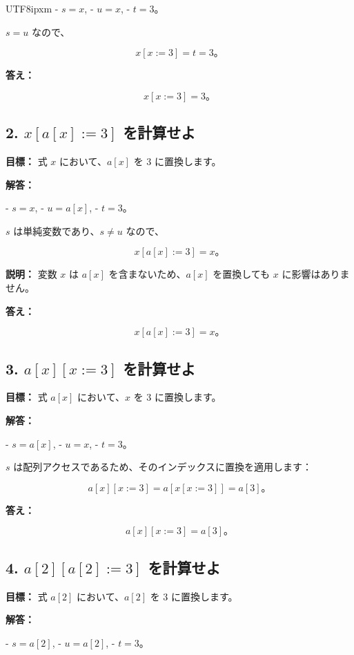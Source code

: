 \documentclass[12pt,a4paper]{article}
\begin{document}
\begin{CJK}{UTF8}{ipxm}
- \( s = x \),
- \( u = x \),
- \( t = 3 \)。

\( s = u \) なので、

\[
x[x := 3] = t = 3。
\]

\textbf{答え：}

\[
x[x := 3] = 3。
\]

\subsection*{2. \( x[a[x] := 3] \) を計算せよ}

\textbf{目標：} 式 \( x \) において、\( a[x] \) を \( 3 \) に置換します。

\textbf{解答：}

- \( s = x \),
- \( u = a[x] \),
- \( t = 3 \)。

\( s \) は単純変数であり、\( s \neq u \) なので、

\[
x[a[x] := 3] = x。
\]

\textbf{説明：} 変数 \( x \) は \( a[x] \) を含まないため、\( a[x] \) を置換しても \( x \) に影響はありません。

\textbf{答え：}

\[
x[a[x] := 3] = x。
\]

\subsection*{3. \( a[x][x := 3] \) を計算せよ}

\textbf{目標：} 式 \( a[x] \) において、\( x \) を \( 3 \) に置換します。

\textbf{解答：}

- \( s = a[x] \),
- \( u = x \),
- \( t = 3 \)。

\( s \) は配列アクセスであるため、そのインデックスに置換を適用します：

\[
a[x][x := 3] = a[x[x := 3]] = a[3]。
\]

\textbf{答え：}

\[
a[x][x := 3] = a[3]。
\]

\subsection*{4. \( a[2][a[2] := 3] \) を計算せよ}

\textbf{目標：} 式 \( a[2] \) において、\( a[2] \) を \( 3 \) に置換します。

\textbf{解答：}

- \( s = a[2] \),
- \( u = a[2] \),
- \( t = 3 \)。


\end{CJK}
\end{document}
